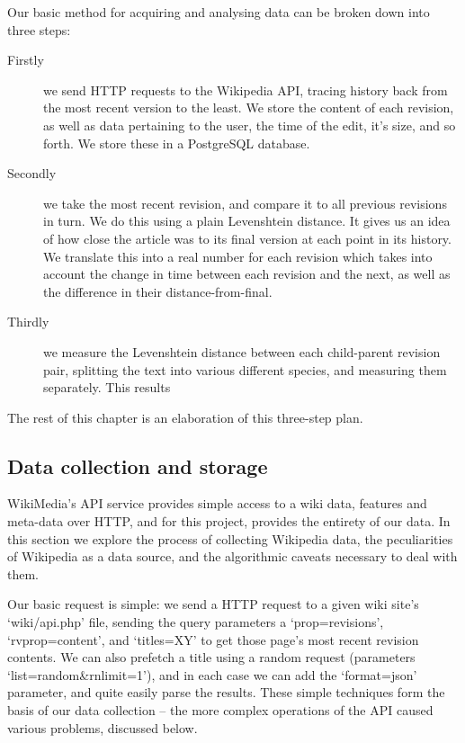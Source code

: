 Our basic method for acquiring and analysing data can be broken down
into three steps:

\begin{description}
\item[Firstly] we send HTTP requests to the Wikipedia API, tracing
  history back from the most recent version to the least. We store the
  content of each revision, as well as data pertaining to the user,
  the time of the edit, it's size, and so forth. We store these in a
  PostgreSQL database.
\item[Secondly] we take the most recent revision, and compare it to all
  previous revisions in turn. We do this using a plain Levenshtein
  distance. It gives us an idea of how close the article was to its
  final version at each point in its history. We translate this into a
  real number for each revision which takes into account the change in
  time between each revision and the next, as well as the difference
  in their distance-from-final.
\item[Thirdly] we measure the Levenshtein distance between each
  child-parent revision pair, splitting the text into various
  different species, and measuring them separately. This results
\end{description}

The rest of this chapter is an elaboration of this three-step plan.

\subsection*{Data collection and storage}
\label{sec:wiki-api}
WikiMedia's API service provides simple access to a wiki data,
features and meta-data over HTTP,\cite{wiki-api} and for this project,
provides the entirety of our data. In this section we explore the
process of collecting Wikipedia data, the peculiarities of Wikipedia
as a data source, and the algorithmic caveats necessary to deal with
them.

Our basic request is simple: we send a HTTP request to a given wiki
site's `wiki/api.php' file, sending the query parameters a
`prop=revisions', `rvprop=content', and `titles=X{\textbar}Y' to get those
page's most recent revision contents. We can also prefetch a title
using a random request (parameters `list=random\&rnlimit=1'), and in
each case we can add the `format=json' parameter, and quite easily
parse the results. These simple techniques form the basis of our data
collection -- the more complex operations of the API caused various
problems, discussed below.

